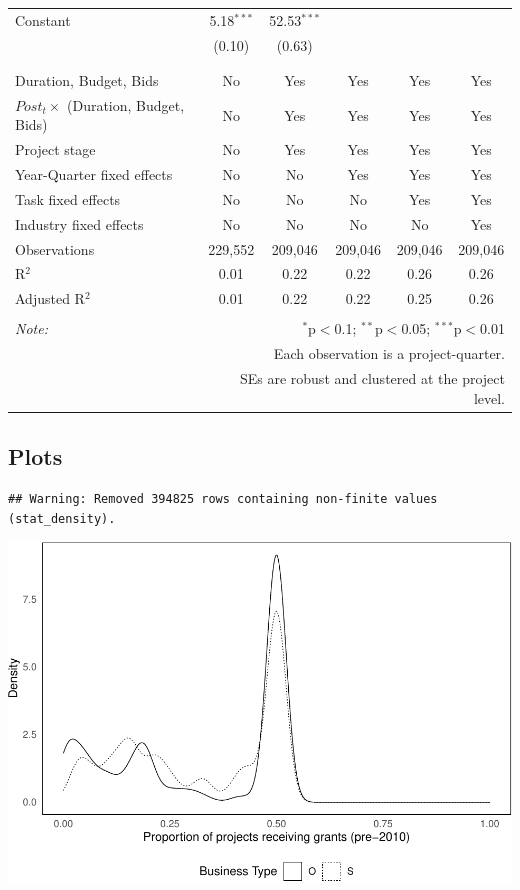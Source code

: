 \documentclass[
]{article}
\begin{document}
\begin{table}[H]
\begin{tabular}{@{\extracolsep{-2pt}}lccccc}
 Constant & 5.18$^{***}$ & 52.53$^{***}$ &  &  &  \\ 
  & (0.10) & (0.63) &  &  &  \\ 
  & & & & & \\ 
\hline \\[-1.8ex] 
Duration, Budget, Bids & No & Yes & Yes & Yes & Yes \\ 
$Post_t \times $  (Duration, Budget, Bids) & No & Yes & Yes & Yes & Yes \\ 
Project stage & No & Yes & Yes & Yes & Yes \\ 
Year-Quarter fixed effects & No & No & Yes & Yes & Yes \\ 
Task fixed effects & No & No & No & Yes & Yes \\ 
Industry fixed effects & No & No & No & No & Yes \\ 
Observations & 229,552 & 209,046 & 209,046 & 209,046 & 209,046 \\ 
R$^{2}$ & 0.01 & 0.22 & 0.22 & 0.26 & 0.26 \\ 
Adjusted R$^{2}$ & 0.01 & 0.22 & 0.22 & 0.25 & 0.26 \\ 
\hline 
\hline \\[-1.8ex] 
\textit{Note:}  & \multicolumn{5}{r}{$^{*}$p$<$0.1; $^{**}$p$<$0.05; $^{***}$p$<$0.01} \\ 
 & \multicolumn{5}{r}{Each observation is a project-quarter.} \\ 
 & \multicolumn{5}{r}{SEs are robust and clustered at the project level.} \\ 
\end{tabular} 
\end{table}

\hypertarget{plots-1}{%
\subsection{Plots}\label{plots-1}}

\begin{verbatim}
## Warning: Removed 394825 rows containing non-finite values (stat_density).
\end{verbatim}

\includegraphics{qp_first_pc_delay-2_files/figure-latex/grants_plots-1.pdf}
\end{document}
